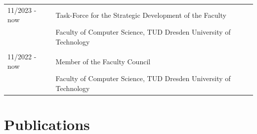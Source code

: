 \documentclass[11pt, a4paper, oneside]{article}
\begin{document}
\begin{tabular}{R{3cm} L{13cm}}
	11/2023 - now   	& Task-Force for the Strategic Development of the Faculty \\ 
									& Faculty of Computer Science, TUD Dresden University of Technology  \\ & \\
	11/2022 - now 	    & Member of the Faculty Council \\ 
									& Faculty of Computer Science, TUD Dresden University of Technology 
\end{tabular}


\section*{Publications}

\nocite{*} 

{}
\end{document}
